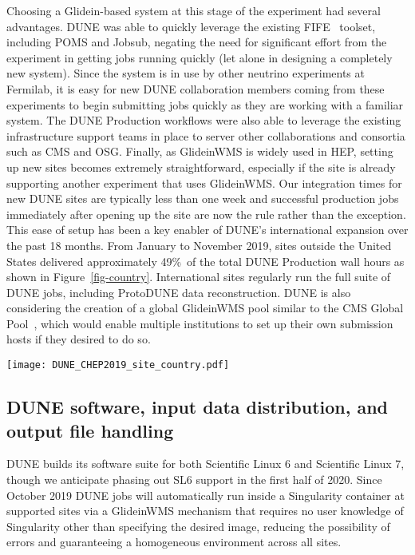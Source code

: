 \documentclass{webofc}
\begin{document}
Choosing a Glidein-based system at this stage of the experiment had several advantages. DUNE was able to quickly leverage the existing FIFE~\cite{FIFE18} toolset, including POMS and Jobsub, negating the
need for significant effort from the experiment in getting jobs running quickly (let alone in designing a completely new system). Since the system is in use by other neutrino experiments at Fermilab, it is easy for new DUNE collaboration members coming from these experiments to 
begin submitting jobs quickly as they are working with a familiar system. The DUNE Production workflows were also able to leverage the existing infrastructure support teams in place to server other collaborations and consortia such as 
CMS and OSG. Finally, as GlideinWMS is widely used in HEP, setting up new sites becomes extremely straightforward, especially if the site is already supporting another experiment that uses GlideinWMS. Our integration times for new 
DUNE sites are typically less than one week and successful production jobs immediately after opening up the site are now the rule rather than the exception. This ease of setup has been a key enabler of DUNE's international expansion over the past 18 months. From January to November 2019, sites outside the United States delivered approximately 49\%\ of the total DUNE Production wall hours as shown in Figure~\ref{fig-country}. International sites regularly run the full suite of DUNE jobs, including ProtoDUNE data reconstruction. DUNE is also considering the creation of a global GlideinWMS pool similar to the CMS Global Pool~\cite{cmsgp,cmsgp2}, which would enable multiple institutions to set up their own submission hosts if they desired to do so.

\begin{figure*}[htb]
\centering
\texttt{[image: DUNE\_CHEP2019\_site\_country.pdf]}
\caption{Wall time-weighted distribution of successful DUNE Production jobs January 2019 to November 2019. Inner ring: distribution by country. Outer ring: distribution by site. Sites outside the United States delivered 49\%\ of the total wall hours for the jobs shown here.}
\label{fig-country}       %
\end{figure*}

\subsection{DUNE software, input data distribution, and output file handling}
\label{subsec:io}
DUNE builds its software suite for both Scientific Linux 6 and Scientific Linux 7, though we anticipate phasing out SL6 support in the first half of 2020. Since October 2019 DUNE jobs will automatically run inside a Singularity container at supported sites via a GlideinWMS mechanism that requires no user knowledge of Singularity other than specifying the desired image, reducing the possibility of errors and guaranteeing a homogeneous environment across all sites.
\end{document}
